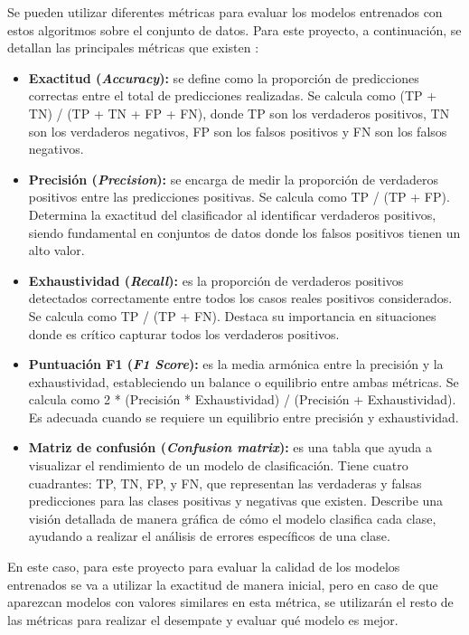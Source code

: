 Se pueden utilizar diferentes métricas para evaluar los modelos entrenados con estos algoritmos sobre el conjunto de datos. Para este proyecto, a continuación, se detallan las principales métricas que existen \cite{metricas}:

\begin{itemize}
    \item \textbf{Exactitud (\textit{Accuracy}):} se define como la proporción de predicciones correctas entre el total de predicciones realizadas. Se calcula como (TP + TN) / (TP + TN + FP + FN), donde TP son los verdaderos positivos, TN son los verdaderos negativos, FP son los falsos positivos y FN son los falsos negativos. 
    \item \textbf{Precisión (\textit{Precision}):} se encarga de medir la proporción de verdaderos positivos entre las predicciones positivas. Se calcula como TP / (TP + FP). Determina la exactitud del clasificador al identificar verdaderos positivos, siendo fundamental en conjuntos de datos donde los falsos positivos tienen un alto valor.
    \item \textbf{Exhaustividad (\textit{Recall}):} es la proporción de verdaderos positivos detectados correctamente entre todos los casos reales positivos considerados. Se calcula como TP / (TP + FN). Destaca su importancia en situaciones donde es crítico capturar todos los verdaderos positivos.
    \item \textbf{Puntuación F1 (\textit{F1 Score}):} es la media armónica entre la precisión y la exhaustividad, estableciendo un balance o equilibrio entre ambas métricas. Se calcula como 2 * (Precisión * Exhaustividad) / (Precisión + Exhaustividad). Es adecuada cuando se requiere un equilibrio entre precisión y exhaustividad.
    \item \textbf{Matriz de confusión (\textit{Confusion matrix}):} es una tabla que ayuda a visualizar el rendimiento de un modelo de clasificación. Tiene cuatro cuadrantes: TP, TN, FP, y FN, que representan las verdaderas y falsas predicciones para las clases positivas y negativas que existen. Describe una visión detallada de manera gráfica de cómo el modelo clasifica cada clase, ayudando a realizar el análisis de errores específicos de una clase.
\end{itemize}

En este caso, para este proyecto para evaluar la calidad de los modelos entrenados se va a utilizar la exactitud de manera inicial, pero en caso de que aparezcan modelos con valores similares en esta métrica, se utilizarán el resto de las métricas para realizar el desempate y evaluar qué modelo es mejor.



